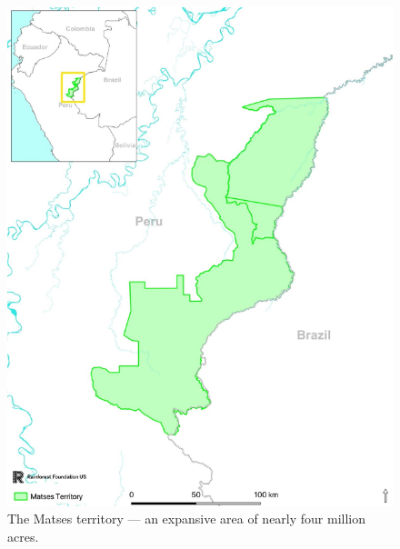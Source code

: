   
\begin{figure}
  \centering
  \includegraphics[width=0.9\columnwidth]{images/image13.png}
  \caption{The Matses territory --- an expansive area of nearly four million acres.}
  \label{fig:matses_territory}
\end{figure}

